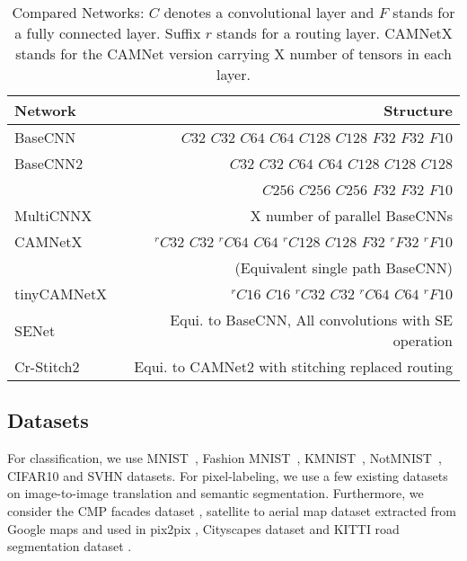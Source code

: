 \documentclass[10pt,twocolumn,letterpaper]{article}
\begin{document}
\begin{table}[ht]
	\caption{Compared Networks: $C$ denotes a convolutional layer and $F$ stands for a fully connected layer. Suffix $r$ stands for a routing layer. CAMNetX stands for the CAMNet version carrying X number of tensors in each layer.}
	\vspace{-0.2in}
	\label{tab:compared_networks}
	\begin{center}
		\renewcommand{\tabcolsep}{0.5mm}
		\begin{tabular}{@{}lr@{}}
			\toprule
			Network & Structure \\
			\midrule
			\small BaseCNN & \footnotesize $C32$ $C32$ $C64$ $C64$ $C128$ $C128$ $F32$ $F32$ $F10$ \\
			\small BaseCNN2 & \footnotesize $C32$ $C32$ $C64$ $C64$ $C128$ $C128$ $C128$  \\& \footnotesize  $C256$  $C256$ $C256$ $F32$ $F32$ $F10$ \\
			\small MultiCNNX & \small X number of parallel BaseCNNs  \\
			\midrule
			\small CAMNetX & \footnotesize $^rC32$ $C32$ $^rC64$ $C64$ $^rC128$ $C128$ $F32$ $^rF32$ $^rF10$ \\& \small (Equivalent single path BaseCNN) \\
			\small tinyCAMNetX & \footnotesize $^rC16$ $C16$ $^rC32$ $C32$ $^rC64$ $C64$ $^rF10$ \\
			\midrule
			\small SENet & \footnotesize Equi. to BaseCNN, All convolutions with SE operation \\
			\small Cr-Stitch2 & \footnotesize Equi. to CAMNet2 with stitching replaced routing  \\
			\bottomrule
		\end{tabular}
	\end{center}
	\vspace{-0.2in}
\end{table}


\subsection{Datasets}
\label{ss:ex_datasets}
\vspace{-0.05in}
For classification, we use MNIST~\cite{mnist}, Fashion MNIST~\cite{fashion}, KMNIST~\cite{kmnist}, NotMNIST~\cite{notmnist}, CIFAR10 \cite{cifar10} and SVHN \cite{svhn} datasets.  For pixel-labeling, we use a few existing datasets on image-to-image translation and semantic segmentation. Furthermore, we consider the CMP facades dataset \cite{Tylecek13}, satellite to aerial map dataset extracted from Google maps and used in pix2pix \cite{isola2017image}, Cityscapes dataset \cite{Cordts2016Cityscapes} and KITTI road segmentation dataset \cite{Fritsch2013ITSC}.  
\end{document}
